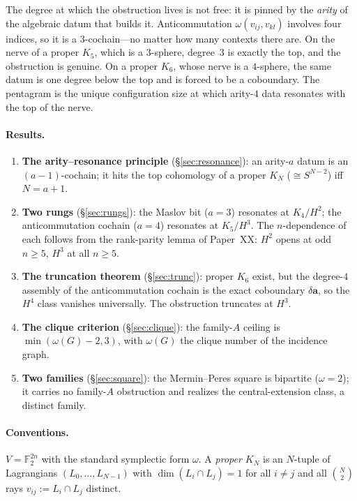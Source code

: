 \documentclass[11pt,a4paper]{article}
\newcommand{\F}{\mathbb{F}}
\theoremstyle{plain}
\theoremstyle{definition}
\theoremstyle{remark}
\begin{document}
The degree at which the obstruction lives is not free: it is pinned by the
\emph{arity} of the algebraic datum that builds it.  Anticommutation
$\omega(v_{ij},v_{kl})$ involves four indices, so it is a $3$-cochain---no matter how
many contexts there are.  On the nerve of a proper $K_5$, which is a $3$-sphere,
degree~$3$ is exactly the top, and the obstruction is genuine.  On a proper $K_6$,
whose nerve is a $4$-sphere, the same datum is one degree below the top and is
forced to be a coboundary.  The pentagram is the unique configuration size at which
arity-$4$ data resonates with the top of the nerve.

\paragraph{Results.}
\begin{enumerate}
\item \textbf{The arity--resonance principle} (\S\ref{sec:resonance}): an arity-$a$
  datum is an $(a-1)$-cochain; it hits the top cohomology of a proper $K_N$
  ($\cong S^{N-2}$) iff $N=a+1$.
\item \textbf{Two rungs} (\S\ref{sec:rungs}): the Maslov bit ($a=3$) resonates at
  $K_4/H^2$; the anticommutation cochain ($a=4$) resonates at $K_5/H^3$.  The
  $n$-dependence of each follows from the rank-parity lemma of Paper~XX:
  $H^2$ opens at odd $n\ge5$, $H^3$ at all $n\ge5$.
\item \textbf{The truncation theorem} (\S\ref{sec:trunc}): proper $K_6$ exist, but
  the degree-$4$ assembly of the anticommutation cochain is the exact coboundary
  $\delta\mathbf a$, so the $H^4$ class vanishes universally.  The obstruction
  truncates at $H^3$.
\item \textbf{The clique criterion} (\S\ref{sec:clique}): the family-$A$ ceiling is
  $\min(\omega(G)-2,3)$, with $\omega(G)$ the clique number of the incidence graph.
\item \textbf{Two families} (\S\ref{sec:square}): the Mermin--Peres square is
  bipartite ($\omega=2$); it carries no family-$A$ obstruction and realizes the
  central-extension class, a distinct family.
\end{enumerate}

\paragraph{Conventions.}
$V=\F_2^{2n}$ with the standard symplectic form $\omega$.  A \emph{proper $K_N$} is
an $N$-tuple of Lagrangians $(L_0,\dots,L_{N-1})$ with $\dim(L_i\cap L_j)=1$ for all
$i\ne j$ and all $\binom N2$ rays $v_{ij}:=L_i\cap L_j$ distinct.
\end{document}
